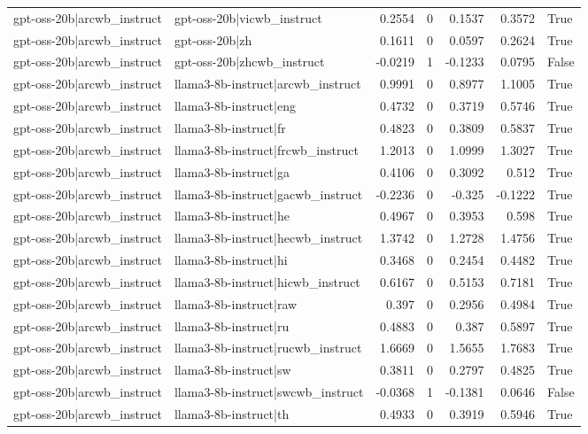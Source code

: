 \begin{table}
\begin{tabular}{l l r r r r l}
gpt-oss-20b|arcwb_instruct & gpt-oss-20b|vicwb_instruct & 0.2554 & 0 & 0.1537 & 0.3572 & True \\
gpt-oss-20b|arcwb_instruct & gpt-oss-20b|zh & 0.1611 & 0 & 0.0597 & 0.2624 & True \\
gpt-oss-20b|arcwb_instruct & gpt-oss-20b|zhcwb_instruct & -0.0219 & 1 & -0.1233 & 0.0795 & False \\
gpt-oss-20b|arcwb_instruct & llama3-8b-instruct|arcwb_instruct & 0.9991 & 0 & 0.8977 & 1.1005 & True \\
gpt-oss-20b|arcwb_instruct & llama3-8b-instruct|eng & 0.4732 & 0 & 0.3719 & 0.5746 & True \\
gpt-oss-20b|arcwb_instruct & llama3-8b-instruct|fr & 0.4823 & 0 & 0.3809 & 0.5837 & True \\
gpt-oss-20b|arcwb_instruct & llama3-8b-instruct|frcwb_instruct & 1.2013 & 0 & 1.0999 & 1.3027 & True \\
gpt-oss-20b|arcwb_instruct & llama3-8b-instruct|ga & 0.4106 & 0 & 0.3092 & 0.512 & True \\
gpt-oss-20b|arcwb_instruct & llama3-8b-instruct|gacwb_instruct & -0.2236 & 0 & -0.325 & -0.1222 & True \\
gpt-oss-20b|arcwb_instruct & llama3-8b-instruct|he & 0.4967 & 0 & 0.3953 & 0.598 & True \\
gpt-oss-20b|arcwb_instruct & llama3-8b-instruct|hecwb_instruct & 1.3742 & 0 & 1.2728 & 1.4756 & True \\
gpt-oss-20b|arcwb_instruct & llama3-8b-instruct|hi & 0.3468 & 0 & 0.2454 & 0.4482 & True \\
gpt-oss-20b|arcwb_instruct & llama3-8b-instruct|hicwb_instruct & 0.6167 & 0 & 0.5153 & 0.7181 & True \\
gpt-oss-20b|arcwb_instruct & llama3-8b-instruct|raw & 0.397 & 0 & 0.2956 & 0.4984 & True \\
gpt-oss-20b|arcwb_instruct & llama3-8b-instruct|ru & 0.4883 & 0 & 0.387 & 0.5897 & True \\
gpt-oss-20b|arcwb_instruct & llama3-8b-instruct|rucwb_instruct & 1.6669 & 0 & 1.5655 & 1.7683 & True \\
gpt-oss-20b|arcwb_instruct & llama3-8b-instruct|sw & 0.3811 & 0 & 0.2797 & 0.4825 & True \\
gpt-oss-20b|arcwb_instruct & llama3-8b-instruct|swcwb_instruct & -0.0368 & 1 & -0.1381 & 0.0646 & False \\
gpt-oss-20b|arcwb_instruct & llama3-8b-instruct|th & 0.4933 & 0 & 0.3919 & 0.5946 & True \\

\end{tabular}
\end{table}
